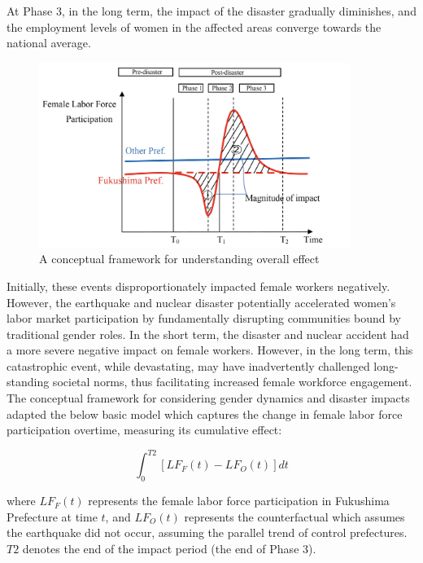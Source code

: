\documentclass[12pt,halfline,a4paper]{ouparticle}
\begin{document}
At Phase 3, in the long term, the impact of the disaster gradually diminishes, and the employment levels of women in the affected areas converge towards the national average.


\begin{figure}[h!]
    \centering
    \includegraphics[width=0.9\textwidth]{A conceptual model.jpeg}  %
    \caption{A conceptual framework for understanding overall effect}
    \label{fig:conceptual_model}
\end{figure}


Initially, these events disproportionately impacted female workers negatively. However, the earthquake and nuclear disaster potentially accelerated women's labor market participation by fundamentally disrupting communities bound by traditional gender roles. In the short term, the disaster and nuclear accident had a more severe negative impact on female workers. However, in the long term, this catastrophic event, while devastating, may have inadvertently challenged long-standing societal norms, thus facilitating increased female workforce engagement. The conceptual framework for considering gender dynamics and disaster impacts adapted the below basic model which captures the change in female labor force participation overtime, measuring its cumulative effect:

\begin{equation}
\int_0^{T2} [LF_F(t) - LF_O(t)] dt
\end{equation}

where $LF_F(t)$ represents the female labor force participation in Fukushima Prefecture at time $t$, and $LF_O(t)$ represents the counterfactual which assumes the earthquake did not occur, assuming the parallel trend of control prefectures. $T2$ denotes the end of the impact period (the end of Phase 3).
\end{document}
